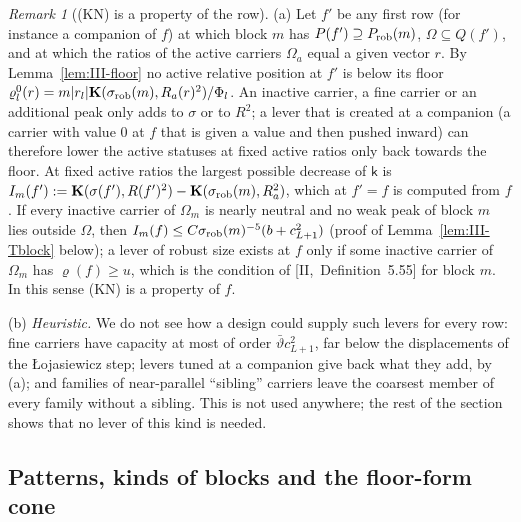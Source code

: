 \documentclass[10pt]{amsart}
\theoremstyle{definition}
\theoremstyle{remark}
\newtheorem{remark}[theorem]{Remark}
\begin{document}
\begin{remark}[(KN) is a property of the row]\label{rem:III-KNf}
(a) Let $f'$ be any first row (for instance a companion of $f$) at which
block $m$ has $P(f')\supseteq P_{\rm rob}(m)$, $\Omega\subseteq Q(f')$, and at
which the ratios of the active carriers $\Omega_a$ equal a given vector $r$.
By Lemma~\ref{lem:III-floor} no active relative position at $f'$ is below its
floor $\varrho^0_l(r)=m|r_l|\mathbf K(\sigma_{\rm rob}(m),R_a(r)^2)/\Phi_l$.  An
inactive carrier, a fine carrier or an additional peak only adds to
$\sigma$ or to $R^2$; a lever that is created at a companion (a carrier with
value $0$ at $f$ that is given a value and then pushed inward) can therefore
lower the active statuses at fixed active ratios only back towards the
floor.  At fixed active ratios the largest possible decrease of $\mathsf k$ is
$I_m(f'):=\mathbf K(\sigma(f'),R(f')^2)-\mathbf K(\sigma_{\rm rob}(m),R_a^2)$,
which at $f'=f$ is computed from $f$.  If every inactive carrier of
$\Omega_m$ is nearly neutral and no weak peak of block $m$ lies outside
$\Omega$, then $I_m(f)\le C\sigma_{\rm rob}(m)^{-5}(b+c_{L+1}^2)$ (proof of
Lemma~\ref{lem:III-Tblock} below); a lever of robust size exists at $f$ only
if some inactive carrier of $\Omega_m$ has $\varrho(f)\ge u$, which is the
condition of [II,~Definition~5.55] for block $m$.  In this sense (KN) is a
property of $f$.

(b) \emph{Heuristic.}  We do not see how a design could supply such levers
for every row: fine carriers have capacity at most of order $\bar\vartheta
c_{L+1}^2$, far below the displacements of the {\L}ojasiewicz step;
levers tuned at a companion give back what they add, by (a); and families
of near-parallel ``sibling'' carriers leave the coarsest member of every
family without a sibling.  This is not used anywhere; the rest of the
section shows that no lever of this kind is needed.
\end{remark}

\subsection{Patterns, kinds of blocks and the floor-form cone}\label{subsec:III-kinds}
\end{document}

